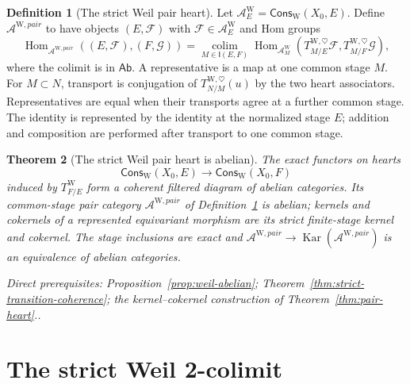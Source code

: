 \documentclass[10pt]{article}
\newtheorem{theorem}{Theorem}[section]
\theoremstyle{definition}
\newtheorem{definition}[theorem]{Definition}
\newcommand{\Hom}{\operatorname{Hom}}
\newcommand{\Kar}{\operatorname{Kar}}
\newcommand{\Cons}{\mathsf{Cons}}
\newcommand{\depends}[1]{\par\smallskip\noindent\textit{Direct prerequisites:} #1.}
\begin{document}
\begin{definition}[The strict Weil pair heart]
\label{def:weil-pair-heart}
Let $\mathcal A_E^{\mathrm W}=\Cons_{\mathrm W}(X_0,E)$.  Define
$\mathcal A^{\mathrm W,pair}$ to have objects $(E,\mathcal F)$ with
$\mathcal F\in\mathcal A_E^{\mathrm W}$ and Hom groups
\[
 \Hom_{\mathcal A^{\mathrm W,pair}}
 ((E,\mathcal F),(F,\mathcal G))
 =\operatorname*{colim}_{M\in\mathsf I(E,F)}
 \Hom_{\mathcal A_M^{\mathrm W}}
 (T^{\mathrm W,\heartsuit}_{M/E}\mathcal F,
  T^{\mathrm W,\heartsuit}_{M/F}\mathcal G),
\]
where the colimit is in $\mathsf{Ab}$.  A representative is a map at one
common stage $M$.  For $M\subset N$, transport is conjugation of
$T^{\mathrm W,\heartsuit}_{N/M}(u)$ by the two heart associators.
Representatives are equal when their transports agree at a further common
stage.  The identity is represented by the identity at the normalized
stage $E$; addition and composition are performed after transport to one
common stage.
\end{definition}

\begin{theorem}[The strict Weil pair heart is abelian]
\label{thm:weil-pair-heart}
The exact functors on hearts
\[
 \Cons_{\mathrm W}(X_0,E)\longrightarrow
 \Cons_{\mathrm W}(X_0,F)
\]
induced by $T^{\mathrm W}_{F/E}$ form a coherent filtered diagram of
abelian categories.  Its common-stage pair category
$\mathcal A^{\mathrm W,pair}$ of
Definition~\ref{def:weil-pair-heart} is abelian; kernels and cokernels of a
represented equivariant morphism are its strict finite-stage kernel and
cokernel.  The stage inclusions are exact and
$\mathcal A^{\mathrm W,pair}\to\Kar(\mathcal A^{\mathrm W,pair})$ is an
equivalence of abelian categories.
\depends{Proposition~\ref{prop:weil-abelian};
Theorem~\ref{thm:strict-transition-coherence}; the kernel--cokernel
construction of Theorem~\ref{thm:pair-heart}.}
\end{theorem}

\section{The strict Weil 2-colimit}
\end{document}
